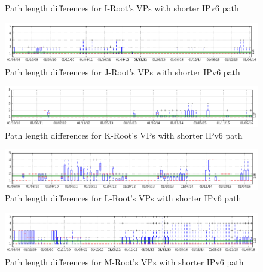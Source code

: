 \begin{appendices}
\begin{figure}[!htb]
		\caption{Path length differences for I-Root's VPs with shorter IPv6 path}
		\label{fig:app:shorter-ipv6-i}
	\end{figure}
	\begin{figure}[!htb]
		\centering
		\includegraphics[width=6.0in]{img/shorter-ipv6-j.png}
		\caption{Path length differences for J-Root's VPs with shorter IPv6 path}
		\label{fig:app:shorter-ipv6-j}
	\end{figure}
	\begin{figure}[!htb]
		\centering
		\includegraphics[width=6.0in]{img/shorter-ipv6-k.png}
		\caption{Path length differences for K-Root's VPs with shorter IPv6 path}
		\label{fig:app:shorter-ipv6-k}
	\end{figure}
	\begin{figure}[!htb]
		\centering
		\includegraphics[width=6.0in]{img/shorter-ipv6-l.png}
		\caption{Path length differences for L-Root's VPs with shorter IPv6 path}
		\label{fig:app:shorter-ipv6-l}
	\end{figure}
	\begin{figure}[!htb]
		\centering
		\includegraphics[width=6.0in]{img/shorter-ipv6-m.png}
		\caption{Path length differences for M-Root's VPs with shorter IPv6 path}
		\label{fig:app:shorter-ipv6-m}
	\end{figure}

\iffalse	

\end{appendices}
